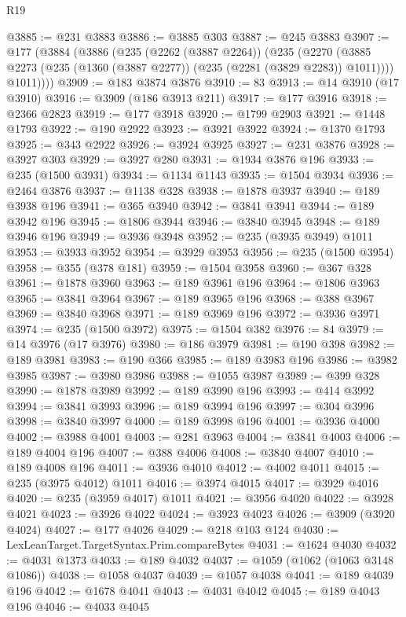 \begin{lexlean}{R19}
\begin{coremodule}
@3885 := @231 @3883
@3886 := @3885 @303
@3887 := @245 @3883
@3907 := @177
    (@3884
      (@3886
        (@235
          (@2262 (@3887 @2264))
          (@235
            (@2270 (@3885 @2273 (@235 (@1360 (@3887 @2277)) (@235 (@2281 (@3829 @2283)) @1011))))
            @1011))))
@3909 := @183 @3874 @3876
@3910 := 83
@3913 := @14 @3910 (@17 @3910)
@3916 := @3909 (@186 @3913 @211)
@3917 := @177 @3916
@3918 := @2366 @2823
@3919 := @177 @3918
@3920 := @1799 @2903
@3921 := @1448 @1793
@3922 := @190 @2922
@3923 := @3921 @3922
@3924 := @1370 @1793
@3925 := @343 @2922
@3926 := @3924 @3925
@3927 := @231 @3876
@3928 := @3927 @303
@3929 := @3927 @280
@3931 := @1934 @3876 @196
@3933 := @235 (@1500 @3931)
@3934 := @1134 @1143
@3935 := @1504 @3934
@3936 := @2464 @3876
@3937 := @1138 @328
@3938 := @1878 @3937
@3940 := @189 @3938 @196
@3941 := @365 @3940
@3942 := @3841 @3941
@3944 := @189 @3942 @196
@3945 := @1806 @3944
@3946 := @3840 @3945
@3948 := @189 @3946 @196
@3949 := @3936 @3948
@3952 := @235 (@3935 @3949) @1011
@3953 := @3933 @3952
@3954 := @3929 @3953
@3956 := @235 (@1500 @3954)
@3958 := @355 (@378 @181)
@3959 := @1504 @3958
@3960 := @367 @328
@3961 := @1878 @3960
@3963 := @189 @3961 @196
@3964 := @1806 @3963
@3965 := @3841 @3964
@3967 := @189 @3965 @196
@3968 := @388 @3967
@3969 := @3840 @3968
@3971 := @189 @3969 @196
@3972 := @3936 @3971
@3974 := @235 (@1500 @3972)
@3975 := @1504 @382
@3976 := 84
@3979 := @14 @3976 (@17 @3976)
@3980 := @186 @3979
@3981 := @190 @398
@3982 := @189 @3981
@3983 := @190 @366
@3985 := @189 @3983 @196
@3986 := @3982 @3985
@3987 := @3980 @3986
@3988 := @1055 @3987
@3989 := @399 @328
@3990 := @1878 @3989
@3992 := @189 @3990 @196
@3993 := @414 @3992
@3994 := @3841 @3993
@3996 := @189 @3994 @196
@3997 := @304 @3996
@3998 := @3840 @3997
@4000 := @189 @3998 @196
@4001 := @3936 @4000
@4002 := @3988 @4001
@4003 := @281 @3963
@4004 := @3841 @4003
@4006 := @189 @4004 @196
@4007 := @388 @4006
@4008 := @3840 @4007
@4010 := @189 @4008 @196
@4011 := @3936 @4010
@4012 := @4002 @4011
@4015 := @235 (@3975 @4012) @1011
@4016 := @3974 @4015
@4017 := @3929 @4016
@4020 := @235 (@3959 @4017) @1011
@4021 := @3956 @4020
@4022 := @3928 @4021
@4023 := @3926 @4022
@4024 := @3923 @4023
@4026 := @3909 (@3920 @4024)
@4027 := @177 @4026
@4029 := @218 @103 @124
@4030 := LexLeanTarget.TargetSyntax.Prim.compareBytes
@4031 := @1624 @4030
@4032 := @4031 @1373
@4033 := @189 @4032
@4037 := @1059 (@1062 (@1063 @3148 @1086))
@4038 := @1058 @4037
@4039 := @1057 @4038
@4041 := @189 @4039 @196
@4042 := @1678 @4041
@4043 := @4031 @4042
@4045 := @189 @4043 @196
@4046 := @4033 @4045

\end{coremodule}
\end{lexlean}
